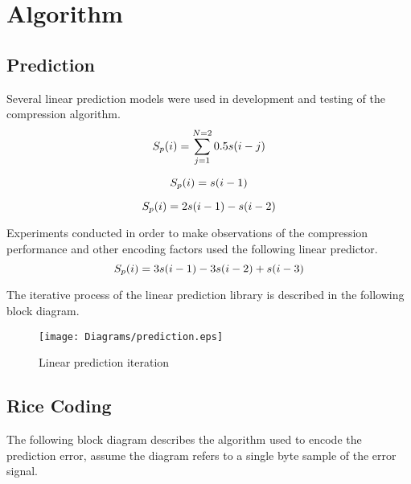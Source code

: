 \documentclass{article}
\begin{document}
\section*{Algorithm}

\subsection*{Prediction}

Several linear prediction models were used in development and testing of the compression algorithm.\\

\begin{equation}
S_p(i) = \sum_{j=1}^{N=2} 0.5s(i-j) \\
\end{equation}

\begin{equation}
S_p(i) = s(i-1) \\
\end{equation}

\begin{equation}
S_p(i) = 2s(i-1) - s(i-2) \\ \\ 
\end{equation}

Experiments conducted in order to make observations of the compression performance and other encoding factors used the following linear predictor. \\

\begin{equation}
S_p(i) = 3s(i-1) - 3s(i-2) + s(i-3) \\
\end{equation}

The iterative process of the linear prediction library is described in the following block diagram.\\
\begin{figure}[!htb]
\centering
\texttt{[image: Diagrams/prediction.eps]}
\caption{Linear prediction iteration}
\label{fig:predict}
\end{figure}

\subsection*{Rice Coding}
The following block diagram describes the algorithm used to encode the prediction error, assume the diagram refers to a single byte sample of the error signal.\\
\end{document}
